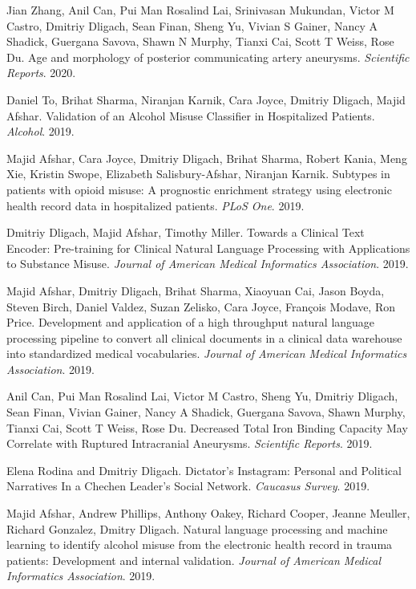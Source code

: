 \documentclass[letterpaper]{article}
\renewenvironment{itemize}{
  \begin{list}{}{
    \setlength{\leftmargin}{1.5em}
  }
}{
  \end{list}
}
\begin{document}
\begin{itemize}
\item Jian Zhang, Anil Can, Pui Man Rosalind Lai, Srinivasan Mukundan, Victor M Castro, Dmitriy Dligach, Sean Finan, Sheng Yu, Vivian S Gainer, Nancy A Shadick, Guergana Savova, Shawn N Murphy, Tianxi Cai, Scott T Weiss, Rose Du. Age and morphology of posterior communicating artery aneurysms. \emph{Scientific Reports}. 2020.
\item Daniel To, Brihat Sharma, Niranjan Karnik, Cara Joyce, Dmitriy Dligach, Majid Afshar. Validation of an Alcohol Misuse Classifier in Hospitalized Patients. \emph{Alcohol}. 2019.
\item Majid Afshar, Cara Joyce, Dmitriy Dligach, Brihat Sharma, Robert Kania, Meng Xie, Kristin Swope, Elizabeth Salisbury-Afshar, Niranjan Karnik. Subtypes in patients with opioid misuse: A prognostic enrichment strategy using electronic health record data in hospitalized patients. \emph{PLoS One}. 2019.
\item Dmitriy Dligach, Majid Afshar, Timothy Miller. Towards a Clinical Text Encoder: Pre-training for Clinical Natural Language Processing with Applications to Substance Misuse. \emph{Journal of American Medical Informatics Association}. 2019.
\item  Majid Afshar, Dmitriy Dligach, Brihat Sharma, Xiaoyuan Cai, Jason Boyda, Steven Birch, Daniel Valdez, Suzan Zelisko, Cara Joyce, François Modave, Ron Price. Development and application of a high throughput natural language processing pipeline to convert all clinical documents in a clinical data warehouse into standardized medical vocabularies. \emph{Journal of American Medical Informatics Association}. 2019.
\item Anil Can, Pui Man Rosalind Lai, Victor M Castro, Sheng Yu, Dmitriy Dligach, Sean Finan, Vivian Gainer, Nancy A Shadick, Guergana Savova, Shawn Murphy, Tianxi Cai, Scott T Weiss, Rose Du. Decreased Total Iron Binding Capacity May Correlate with Ruptured Intracranial Aneurysms. \emph{Scientific Reports}. 2019.
\item Elena Rodina and Dmitriy Dligach. Dictator's Instagram: Personal and Political Narratives In a Chechen Leader's Social Network. \emph{Caucasus Survey}. 2019.
\item Majid Afshar, Andrew Phillips, Anthony Oakey, Richard Cooper, Jeanne Meuller, Richard Gonzalez, Dmitry Dligach. Natural language processing and machine learning to identify alcohol misuse from the electronic health record in trauma patients: Development and internal validation. \emph{Journal of American Medical Informatics Association}. 2019.

\end{itemize}
\end{document}
